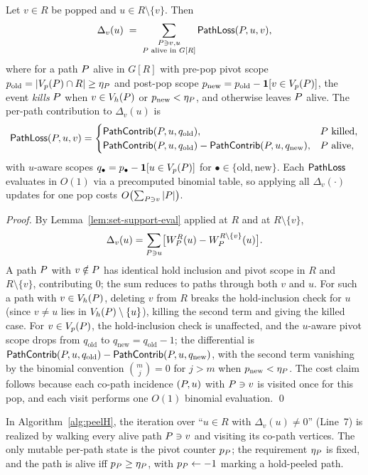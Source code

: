 \begin{lemma}\label{lem:changeonly-cpi}
Let $v\in R$ be popped and $u\in R\setminus\{v\}$.
%
Then
\[
  \Delta_v(u) \;=\; \sum_{\substack{\TPath\ni v,u \\ \TPath \text{ alive in } G[R]}} \pathLoss(\TPath, u, v),
\]
where for a path $\TPath$ alive in $G[R]$ with pre-pop pivot scope $p_{\mathrm{old}}=|\Vp(\TPath)\cap R|\ge\eta_{\TPath}$ and post-pop scope $p_{\mathrm{new}}=p_{\mathrm{old}}-\mathbf{1}[v\in\Vp(\TPath)]$, the event \emph{kills} $\TPath$ when $v\in\Vh(\TPath)$ or $p_{\mathrm{new}}<\eta_{\TPath}$, and otherwise leaves $\TPath$ alive.
%
The per-path contribution to $\Delta_v(u)$ is
\[
  \pathLoss(\TPath,u,v) =
  \begin{cases}
    \pathContrib(\TPath,u,q_{\mathrm{old}}), & \TPath \text{ killed}, \\
    \pathContrib(\TPath,u,q_{\mathrm{old}}) - \pathContrib(\TPath,u,q_{\mathrm{new}}), & \TPath \text{ alive},
  \end{cases}
\]
with $u$-aware scopes $q_{\bullet}=p_{\bullet}-\mathbf{1}[u\in\Vp(\TPath)]$ for $\bullet\in\{\mathrm{old},\mathrm{new}\}$.
%
Each ${\mathsf{PathLoss}}$ evaluates in $O(1)$ via a precomputed binomial table, so applying all $\Delta_v(\cdot)$ updates for one pop costs $O\bigl(\sum_{\TPath\ni v}|\TPath|\bigr)$.
\end{lemma}

\begin{proof}
By Lemma~\ref{lem:set-support-eval} applied at $R$ and at $R\setminus\{v\}$,
\[
  \Delta_v(u)=\sum_{\TPath\ni u}\bigl[W_{\TPath}^{R}(u)-W_{\TPath}^{R\setminus\{v\}}(u)\bigr].
\]
A path $\TPath$ with $v\notin\TPath$ has identical hold inclusion and pivot scope in $R$ and $R\setminus\{v\}$, contributing $0$; the sum reduces to paths through both $v$ and $u$.
%
For such a path with $v\in\Vh(\TPath)$, deleting $v$ from $R$ breaks the hold-inclusion check for $u$ (since $v\ne u$ lies in $\Vh(\TPath)\setminus\{u\}$), killing the second term and giving the killed case.
%
For $v\in\Vp(\TPath)$, the hold-inclusion check is unaffected, and the $u$-aware pivot scope drops from $q_{\mathrm{old}}$ to $q_{\mathrm{new}}=q_{\mathrm{old}}-1$; the differential is $\pathContrib(\TPath,u,q_{\mathrm{old}})-\pathContrib(\TPath,u,q_{\mathrm{new}})$, with the second term vanishing by the binomial convention $\binom{m}{j}=0$ for $j>m$ when $p_{\mathrm{new}}<\eta_{\TPath}$.
%
The cost claim follows because each co-path incidence $(\TPath,u)$ with $\TPath\ni v$ is visited once for this pop, and each visit performs one $O(1)$ binomial evaluation.
%
\qed
\end{proof}

In Algorithm~\ref{alg:peelH}, the iteration over ``$u\in R$ with $\Delta_v(u)\ne 0$'' (Line~7) is realized by walking every alive path $\TPath\ni v$ and visiting its co-path vertices.
%
The only mutable per-path state is the pivot counter $p_{\TPath}$; the requirement $\eta_{\TPath}$ is fixed, and the path is alive iff $p_{\TPath}\ge\eta_{\TPath}$, with $p_{\TPath}\gets-1$ marking a hold-peeled path.
